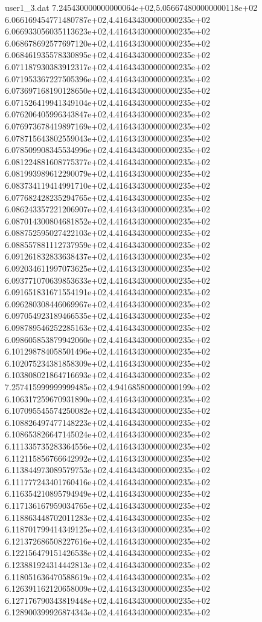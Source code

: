 \begin{filecontents}{user1_3.dat}
7.245430000000000064e+02,5.056674800000000118e+02
6.066169454771480787e+02,4.416434300000000235e+02
6.066933056035113623e+02,4.416434300000000235e+02
6.068678692577697120e+02,4.416434300000000235e+02
6.068461935578330895e+02,4.416434300000000235e+02
6.071187930383912317e+02,4.416434300000000235e+02
6.071953367227505396e+02,4.416434300000000235e+02
6.073697168190128650e+02,4.416434300000000235e+02
6.071526419941349104e+02,4.416434300000000235e+02
6.076206405996343847e+02,4.416434300000000235e+02
6.076973678419897169e+02,4.416434300000000235e+02
6.078715643802559043e+02,4.416434300000000235e+02
6.078509908345534996e+02,4.416434300000000235e+02
6.081224881608775377e+02,4.416434300000000235e+02
6.081993989612290079e+02,4.416434300000000235e+02
6.083734119414991710e+02,4.416434300000000235e+02
6.077682428235294765e+02,4.416434300000000235e+02
6.086243357221206907e+02,4.416434300000000235e+02
6.087014300804681852e+02,4.416434300000000235e+02
6.088752595027422103e+02,4.416434300000000235e+02
6.088557881112737959e+02,4.416434300000000235e+02
6.091261832833638437e+02,4.416434300000000235e+02
6.092034611997073625e+02,4.416434300000000235e+02
6.093771070639853633e+02,4.416434300000000235e+02
6.091651831671554191e+02,4.416434300000000235e+02
6.096280308446069967e+02,4.416434300000000235e+02
6.097054923189466535e+02,4.416434300000000235e+02
6.098789546252285163e+02,4.416434300000000235e+02
6.098605853879942060e+02,4.416434300000000235e+02
6.101298784058501496e+02,4.416434300000000235e+02
6.102075234381858309e+02,4.416434300000000235e+02
6.103808021864716693e+02,4.416434300000000235e+02
7.257415999999999485e+02,4.941685800000000199e+02
6.106317259670931890e+02,4.416434300000000235e+02
6.107095545574250082e+02,4.416434300000000235e+02
6.108826497477148223e+02,4.416434300000000235e+02
6.108653826647145024e+02,4.416434300000000235e+02
6.111335735283364556e+02,4.416434300000000235e+02
6.112115856766642992e+02,4.416434300000000235e+02
6.113844973089579753e+02,4.416434300000000235e+02
6.111777243401760416e+02,4.416434300000000235e+02
6.116354210895794949e+02,4.416434300000000235e+02
6.117136167959034765e+02,4.416434300000000235e+02
6.118863448702011283e+02,4.416434300000000235e+02
6.118701799414349125e+02,4.416434300000000235e+02
6.121372686508227616e+02,4.416434300000000235e+02
6.122156479151426538e+02,4.416434300000000235e+02
6.123881924314442813e+02,4.416434300000000235e+02
6.118051636470588619e+02,4.416434300000000235e+02
6.126391162120658009e+02,4.416434300000000235e+02
6.127176790343819448e+02,4.416434300000000235e+02
6.128900399926874343e+02,4.416434300000000235e+02

\end{filecontents}
